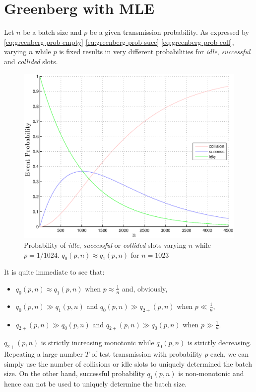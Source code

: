 \documentclass[12pt,a4paper]{report}
\begin{document}
\section{Greenberg with MLE}

Let $n$ be a batch size and $p$ be a given transmission probability. As expressed by \eqref{eq:greenberg-prob-empty} \eqref{eq:greenberg-prob-succ} \eqref{eq:greenberg-prob-coll}, varying $n$ while $p$ is fixed results in very different probabilities for \emph{idle}, \emph{successful} and \emph{collided} slots.

\begin{figure}[H]
\begin{center}
\includegraphics[scale=.7]{matlab/Greenberg_MLE/draw_coll_idle_succ_fixed_p}
\caption[Event probability fixed $p$]{Probability of \emph{idle}, \emph{successful} or \emph{collided} slots varying $n$ while  $p=1/1024$.  $q_{0}(p,n) \approx  q_{1}(p,n)$ for $n=1023$}
\end{center}
\end{figure}

It is quite immediate to see that:
\begin{itemize}
\item $q_{0}(p,n) \approx q_{1}(p,n)$ when $p\approx {\displaystyle\frac{1}{n}}$ and, obviously,
\item $q_{0}(p,n) \gg q_{1}(p,n)$ and $q_{0}(p,n) \gg q_{2+}(p,n)$ when $p \ll {\displaystyle\frac{1}{n}}$,
\item $q_{2+}(p,n) \gg q_{0}(p,n)$ and $q_{2+}(p,n) \gg q_{0}(p,n)$ when $p \gg {\displaystyle\frac{1}{n}}$.
\end{itemize}
$q_{2+}(p,n)$ is strictly increasing monotonic while $q_{0}(p,n)$ is strictly decreasing. Repeating a large number $T$ of test transmission with  probability $p$ each, we can simply use the number of collisions or idle slots to uniquely determined the batch size. On the other hand, successful probability $q_{1}(p,n)$ is non-monotonic and hence can not be used to uniquely determine the batch size.\\
 
\end{document}
